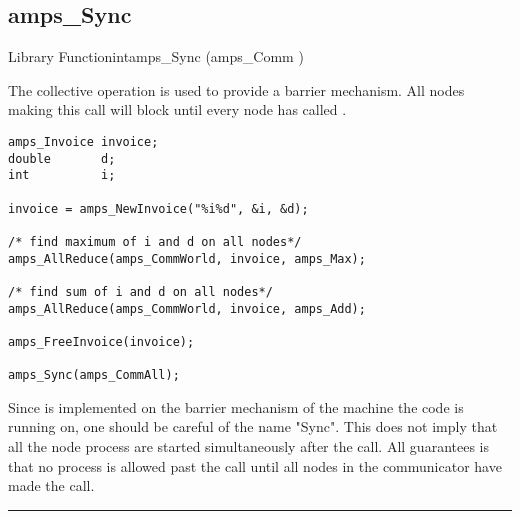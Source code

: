 \subsection{amps\_Sync}
\label{amps_Sync}

\begin{deftypefn}{Library Function}{int}{amps\_Sync}
(amps_Comm )

\DESCRIPTION

The collective operation  is used to provide a barrier
mechanism.  All nodes making this call will block until every node has
called .


\EXAMPLE

\begin{display}\begin{verbatim}
amps_Invoice invoice;
double       d;
int          i;

invoice = amps_NewInvoice("%i%d", &i, &d);

/* find maximum of i and d on all nodes*/
amps_AllReduce(amps_CommWorld, invoice, amps_Max);

/* find sum of i and d on all nodes*/
amps_AllReduce(amps_CommWorld, invoice, amps_Add);

amps_FreeInvoice(invoice);

amps_Sync(amps_CommAll);

\end{verbatim}\end{display}

\NOTES

Since  is implemented on the barrier mechanism of the
machine the code is running on, one should be careful of the name "Sync".
This does not imply that all the node process are started simultaneously
after the call.  All  guarantees is that no process is allowed
past the call until all nodes in the communicator have made the call.

\end{deftypefn}


\noindent\rule{\textwidth}{1mm}

